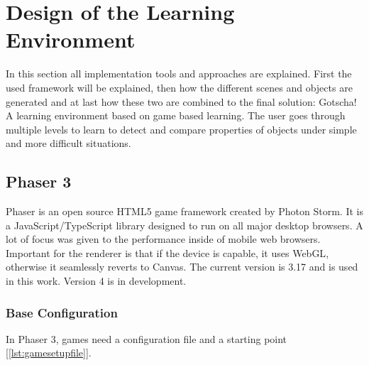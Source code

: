 
\chapter{Design of the Learning Environment}\label{ch:design}

In this section all implementation tools and approaches are explained.
First the used framework will be explained, then how the different scenes and objects are generated and
at last how these two are combined to the final solution: Gotscha! A learning environment based on game based learning.
The user goes through multiple levels to learn to detect and compare properties of objects
under simple and more difficult situations.

\section{Phaser 3}\label{sec:phaser-3}

Phaser\cite{phaser} is an open source HTML5\cite{html5} game framework created by Photon Storm\cite{phaser}.
It is a JavaScript/TypeScript\cite{typescript} library designed to run on all major desktop browsers.
A lot of focus was given to the performance inside of mobile web browsers.
Important for the renderer is that if the device is capable, it uses WebGL\cite{webgl}, otherwise it seamlessly reverts to Canvas\cite{canvas}.
The current version is 3.17 and is used in this work. Version 4 is in development.

\subsection{Base Configuration}\label{subsec:base-configuration}
In Phaser 3, games need a configuration file and a starting point [\ref{lst:gamesetupfile}].

